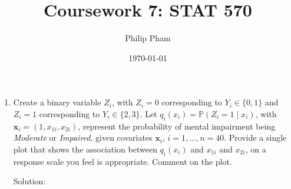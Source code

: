 \documentclass[letterpaper,11pt]{article}
\title{Coursework 7: STAT 570}
\author{Philip Pham}
\date{\today}
\begin{document}
\maketitle
\begin{enumerate}
\item Create a binary variable $Z_i$, with $Z_i = 0$ corresponding to
  $Y_i \in \{0,1\}$ and $Z_i = 1$ corresponding to $Y_i \in \{2,3\}$. Let
  $q_i\left(x_i\right) = \mathbb{P}(Z_i = 1 \mid x_i)$, with
  $\mathbf{x}_i = \left(1, x_{1i} ,x_{2i} \right)$, represent the probability of
  mental impairment being \emph{Moderate} or \emph{Impaired}, given covariates
  $\mathbf{x}_i$, $i = 1,\ldots,n = 40$.  Provide a single plot that shows the
  association between $q_i\left(x_i\right)$ and $x_{1i}$ and $x_{2i}$, on a
  response scale you feel is appropriate. Comment on the plot.

  \begin{description}
  \item[Solution:] 
  \end{description}
\end{enumerate}
\end{document}
